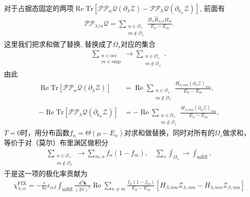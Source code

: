 \documentclass[10pt, oneside]{article}
\begin{document}
对于占据态固定的两项\(\operatorname{Re} \mathrm{Tr} \left[\mathcal{P} \mathcal{P}_{\alpha} \mathcal{Q} \left( \partial_{\lambda} \mathcal{Z}\right) - \mathcal{P} \mathcal{P}_{\lambda} \mathcal{Q} \left(\partial_{k_{\alpha}} \mathcal{Z}\right)\right]\), 前面有
\begin{align}
	\mathcal{P} \mathcal{P}_{\lambda/\alpha} \mathcal{Q} = \sum_{\substack{n \in \mathcal{O}_s \\ m \notin \mathcal{O}_s}} \frac{\Pi_{n} \hat{H}_{\lambda/\alpha} \Pi_{m }}{E_{n } - E_{m }}.
\end{align}
这里我们把求和做了替换, 替换成了\(\Omega_{s }\)对应的集合
\begin{align}
	\sum_{\substack{n \in \mathrm{occ} \\ m \in \mathrm{emp}}} \rightarrow \sum_{\substack{n \in \mathcal{O}_s \\ m \notin \mathcal{O}_s}},
\end{align}
由此
\begin{align}
	\operatorname{Re} \mathrm{Tr} \left[\mathcal{P} \mathcal{P}_{\alpha} \mathcal{Q} \left( \partial_{\lambda} \mathcal{Z}\right)\right]  &= \operatorname{Re} \sum_{\substack{n \in \mathcal{O}_s \\ m \notin \mathcal{O}_s}} \frac{H_{\alpha,nm } \left(\partial_{\lambda} \mathcal{Z}\right)_{mn}}{E_{n } - E_{m }}, \\
	-\operatorname{Re} \mathrm{Tr} \left[\mathcal{P} \mathcal{P}_{\lambda} \mathcal{Q} \left(\partial_{k_{\alpha}} \mathcal{Z}\right)\right] &= -\operatorname{Re}  \sum_{\substack{n \in \mathcal{O}_s \\ m \notin \mathcal{O}_s}} \frac{H_{\lambda,nm } \left(\partial_{\alpha} \mathcal{Z}\right)_{mn}}{E_{n } - E_{m }},
\end{align}
\(T = 0\)时，用分布函数\(f_{n} = \Theta \left(\mu - E_{n}\right)\)对求和做替换，同时对所有的\(\Omega_{s }\)做求和，等价于对（莫尔）布里渊区做积分
\begin{align}
	\sum_{\substack{n \in \mathcal{O}_s \\ m \notin \mathcal{O}_s}} \rightarrow \sum_{m,n} f_{n} \left(1 - f_{m}\right),\quad \sum_{s } \int_{\Omega_{s }} \rightarrow \int_{\mathrm{mBZ}},
\end{align}
于是这一项的极化率贡献为
\begin{align}
	\boxed{
		\chi^{\mathrm{FIX}}_{\lambda, \alpha} = - \frac{e}{ \hbar c } \epsilon_{\alpha \beta} \int_{\mathrm{mBZ}} \frac{\mathrm{d}^{2} \bm{k}}{\left(2 \pi\right)^2} \operatorname{Re} \sum_{n \neq m} \frac{f_{n} \left(1 - f_{m }\right)}{E_{n } - E_{m}} \left[H_{\beta, nm} \mathcal{Z}_{\lambda,mn} - H_{\lambda, nm} \mathcal{Z}_{\beta,mn} \right]
	}
\end{align}
\end{document}
